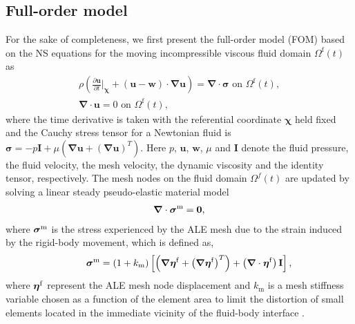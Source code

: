 \documentclass[standard]{jfm}
\def\vec#1{\mbox{\boldmath $#1$}}
\newcommand{\bx}{\mathbf{\chi}}
\newcommand{\bu}{\mathbf{u}}
\newcommand{\bw}{\mathbf{w}}
\def\Otf{\Omega^\mathrm{f}(t)}
\def\stress{{\vec \sigma}}
\def\div{\vec \nabla}
\begin{document}
\subsection{Full-order model}
For the sake of completeness, 
we first present the full-order model (FOM) based on the NS equations
for the moving incompressible viscous fluid domain $\Otf$ as
\begin{align}
\rho \left( \frac{\partial \bu }{\partial t} \bigg\rvert_{{\bx}} + \left(\bu -\bw\right)\cdot \boldsymbol{\nabla} \bu
 \right)= 
 \boldsymbol{\nabla} \cdot \boldsymbol{\sigma} \mbox{ on } \Otf, \label{eq:N-S} \\
\boldsymbol{\nabla} \cdot\bu = 0 \mbox{ on } \Otf, \label{eq:continuity}
\end{align}
where the time derivative is taken 
with the referential coordinate ${\bx}$ held fixed and 
the Cauchy stress tensor for a Newtonian fluid is 
$\boldsymbol{\sigma} = -p\mathbf{I} + \mu \left(\boldsymbol{\nabla} \bu 
+ \left(\boldsymbol{\nabla} \bu \right)^T
\right) $. Here $p$, $\bu$, $\bw$,  $\mu$ and $ \mathbf{I} $  denote the fluid pressure, 
the fluid velocity, the mesh velocity, the dynamic viscosity and 
the identity tensor, respectively. 
%
The mesh nodes on the fluid domain $\Omega^f(t)$ are updated by solving a linear steady pseudo-elastic material model
\begin{align}
\label{MeshEq}
\div \cdot \stress^\mathrm{m} = \vec{0},
\end{align} 
where $\stress^\mathrm{m}$ is the stress experienced by the ALE mesh due to the strain induced by the 
rigid-body movement, which is defined as,
\begin{align}
\label{meshEq}
\qquad \stress^\mathrm{m} = (1+k_\mathrm{m})\left[\left(\div \vec{\eta}^\mathrm{f}+\left(\div
\vec{\eta}^\mathrm{f}\right)^T\right)+\left(\div \cdot \vec{\eta}^\mathrm{f}\right)\vec{\mathrm{I}} \right],
\end{align}
where $\vec{\eta}^\mathrm{f}$ represent the ALE mesh node displacement and 
$k_\mathrm{m}$ is a mesh stiffness variable chosen as a function of the element area to 
limit the distortion of small elements located in the immediate vicinity of the fluid-body 
interface \cite{Liu2014}.
\end{document}
